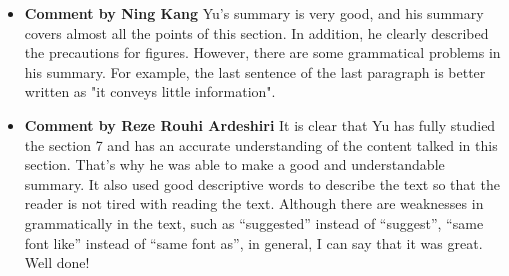 \documentclass[paper=a4, fontsize=11pt]{scrartcl} %
\numberwithin{equation}{section} %
\numberwithin{figure}{section} %
\numberwithin{table}{section} %
\begin{document}
		\begin{itemize}
			\item \textbf{Comment by Ning Kang} \newline
				Yu's summary is very good, and his summary covers almost all the points of this section. In addition, he clearly described the precautions for figures. However, there are some grammatical problems in his summary. For example, the last sentence of the last paragraph is better written as "it conveys little information".
				
			\item \textbf{Comment by Reze Rouhi Ardeshiri} \newline
				It is clear that Yu has fully studied the section 7 and has an accurate understanding of the content talked in this section. That's why he was able to make a good and understandable summary. It also used good descriptive words to describe the text so that the reader is not tired with reading the text. Although there are weaknesses in grammatically in the text, such as “suggested” instead of “suggest”, “same font like” instead of “same font as”, in general, I can say that it was great. Well done!
				
		\end{itemize}
		
\end{document}
